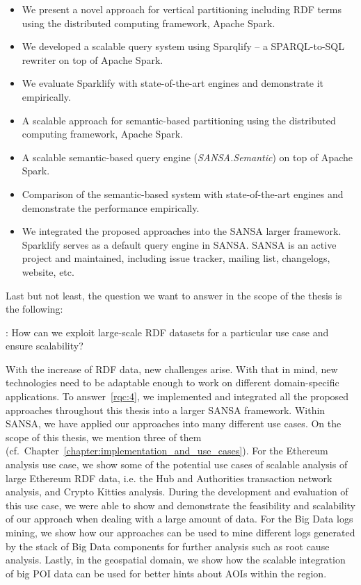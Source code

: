 \begin{itemize}
 \item We present a novel approach for vertical partitioning including \gls{RDF} terms using the distributed computing framework, Apache Spark.
 \item We developed a scalable query system using Sparqlify -- a SPARQL-to-SQL rewriter on top of Apache Spark.
 \item We evaluate Sparklify with state-of-the-art engines and demonstrate it empirically.
 \item A scalable approach for semantic-based partitioning using the distributed computing framework, Apache Spark.
 \item A scalable semantic-based query engine (\textit{SANSA.Semantic}) on top of Apache Spark.
 \item Comparison of the semantic-based system with state-of-the-art engines and demonstrate the performance empirically.
 \item We integrated the proposed approaches into the SANSA larger framework.
 Sparklify serves as a default query engine in SANSA.
 SANSA is an active project and maintained, including issue tracker, mailing list, changelogs, website, etc.
\end{itemize}

Last but not least, the question we want to answer in the scope of the thesis is the following:

\begin{tcolorbox}
\textbf{\rqNr[RQ4]\label{rqc:4}}: How can we exploit large-scale \gls{RDF} datasets for a particular use case and ensure scalability?
\end{tcolorbox}

With the increase of \gls{RDF} data, new challenges arise.
With that in mind, new technologies need to be adaptable enough to work on different domain-specific applications.
To answer~\ref{rqc:4}, we implemented and integrated all the proposed approaches throughout this thesis into a larger SANSA framework.
Within SANSA, we have applied our approaches into many different use cases.
On the scope of this thesis, we mention three of them (cf.\ Chapter~\ref{chapter:implementation_and_use_cases}).
For the Ethereum analysis use case, we show some of the potential use cases of scalable analysis of large Ethereum \gls{RDF} data, i.e. the Hub and Authorities transaction network analysis, and Crypto Kitties analysis.
During the development and evaluation of this use case, we were able to show and demonstrate the feasibility and scalability of our approach when dealing with a large amount of data.
For the Big Data logs mining, we show how our approaches can be used to mine different logs generated by the stack of Big Data components for further analysis such as root cause analysis.
Lastly, in the geospatial domain, we show how the scalable integration of big \gls{POI} data can be used for better hints about \gls{AOI}s within the region.



